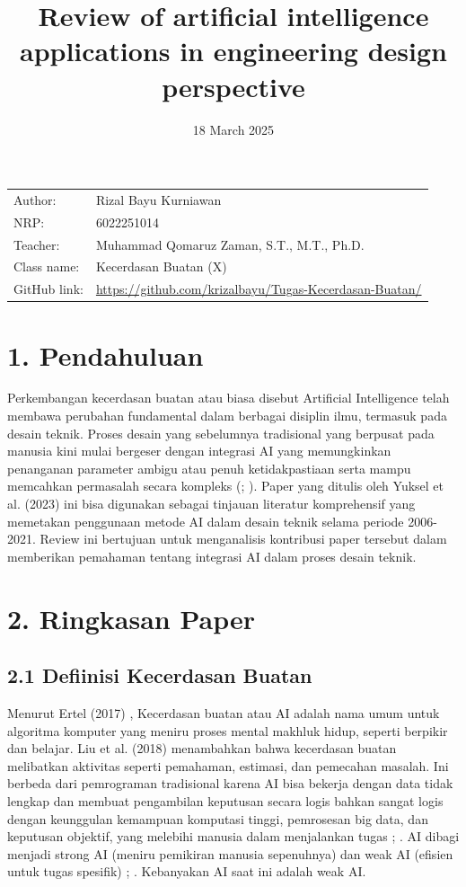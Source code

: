 \documentclass{article}
\title{Review of artificial intelligence applications in engineering design
perspective
}
\date{18 March 2025}
\begin{document}
\maketitle


\noindent\begin{tabular}{@{}ll}
    Author: & Rizal Bayu Kurniawan\\
    NRP: & 6022251014\\
     Teacher: &  Muhammad Qomaruz Zaman, S.T., M.T., Ph.D.\\
     Class name: & Kecerdasan Buatan (X)\\
     GitHub link: & \url{https://github.com/krizalbayu/Tugas-Kecerdasan-Buatan/}
\end{tabular}
\vspace{1cm}


\section*{1. Pendahuluan}
Perkembangan kecerdasan buatan atau biasa disebut Artificial Intelligence telah membawa perubahan fundamental dalam berbagai disiplin ilmu, termasuk pada desain teknik. Proses desain yang sebelumnya tradisional yang berpusat pada manusia kini mulai bergeser dengan integrasi AI yang memungkinkan penanganan parameter ambigu atau penuh ketidakpastiaan serta mampu memcahkan permasalah secara kompleks (\cite{pahl2013engineering}; \cite{huang2019review}). Paper yang ditulis oleh Yuksel et al. (2023)\cite{yuksel2023review} ini bisa digunakan sebagai tinjauan literatur komprehensif yang memetakan penggunaan metode AI dalam desain teknik selama periode 2006-2021. Review ini bertujuan untuk menganalisis kontribusi paper tersebut dalam memberikan pemahaman tentang integrasi AI dalam proses desain teknik.

\section*{2. Ringkasan Paper} %
\subsection*{2.1 Defiinisi Kecerdasan Buatan}
Menurut Ertel (2017) \cite{ertel2017introduction}, Kecerdasan buatan atau AI adalah nama umum untuk algoritma komputer yang meniru proses mental makhluk hidup, seperti berpikir dan belajar. Liu et al. (2018) \cite{liu2018artificial} menambahkan bahwa kecerdasan buatan melibatkan aktivitas seperti pemahaman, estimasi, dan pemecahan masalah. Ini berbeda dari pemrograman tradisional karena AI bisa bekerja dengan data tidak lengkap dan membuat pengambilan keputusan secara logis bahkan sangat logis dengan keunggulan kemampuan komputasi tinggi, pemrosesan big data, dan keputusan objektif, yang melebihi manusia dalam menjalankan tugas \cite{liao2020framework} ; \cite{allison2022artificial}.
AI dibagi menjadi strong AI (meniru pemikiran manusia sepenuhnya) dan weak AI (efisien untuk tugas spesifik) \cite{verganti2020innovation} ; \cite{lucci2016artificial}. Kebanyakan AI saat ini adalah weak AI.
\end{document}
